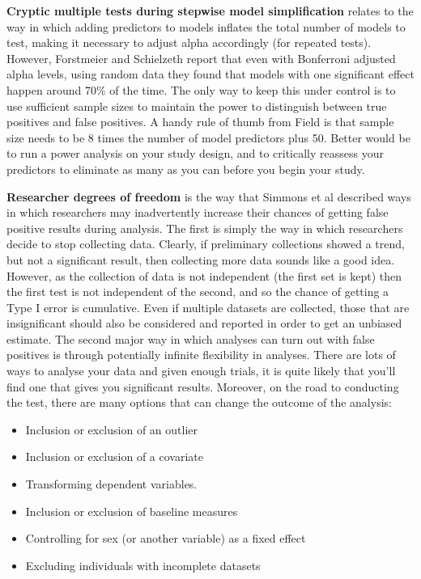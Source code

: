 \documentclass[
]{krantz}
\providecommand{\tightlist}{%
  \setlength{\itemsep}{0pt}\setlength{\parskip}{0pt}}
\begin{document}
\textbf{Cryptic multiple tests during stepwise model simplification} relates to the way in which adding predictors to models inflates the total number of models to test, making it necessary to adjust alpha accordingly (for repeated tests). However, Forstmeier and Schielzeth \citeyearpar{forstmeier2017detecting} report that even with Bonferroni adjusted alpha levels, using random data they found that models with one significant effect happen around 70\% of the time. The only way to keep this under control is to use sufficient sample sizes to maintain the power to distinguish between true positives and false positives. A handy rule of thumb from Field \citeyearpar{field2013discovering} is that sample size needs to be 8 times the number of model predictors plus 50. Better would be to run a power analysis on your study design, and to critically reassess your predictors to eliminate as many as you can before you begin your study.

\textbf{Researcher degrees of freedom} is the way that Simmons et al \citeyearpar{simmons2011false} described ways in which researchers may inadvertently increase their chances of getting false positive results during analysis. The first is simply the way in which researchers decide to stop collecting data. Clearly, if preliminary collections showed a trend, but not a significant result, then collecting more data sounds like a good idea. However, as the collection of data is not independent (the first set is kept) then the first test is not independent of the second, and so the chance of getting a Type I error is cumulative. Even if multiple datasets are collected, those that are insignificant should also be considered and reported in order to get an unbiased estimate. The second major way in which analyses can turn out with false positives is through potentially infinite flexibility in analyses. There are lots of ways to analyse your data and given enough trials, it is quite likely that you'll find one that gives you significant results. Moreover, on the road to conducting the test, there are many options that can change the outcome of the analysis:

\begin{itemize}
\tightlist
\item
  Inclusion or exclusion of an outlier
\item
  Inclusion or exclusion of a covariate
\item
  Transforming dependent variables.
\item
  Inclusion or exclusion of baseline measures
\item
  Controlling for sex (or another variable) as a fixed effect
\item
  Excluding individuals with incomplete datasets
\end{itemize}
\end{document}
